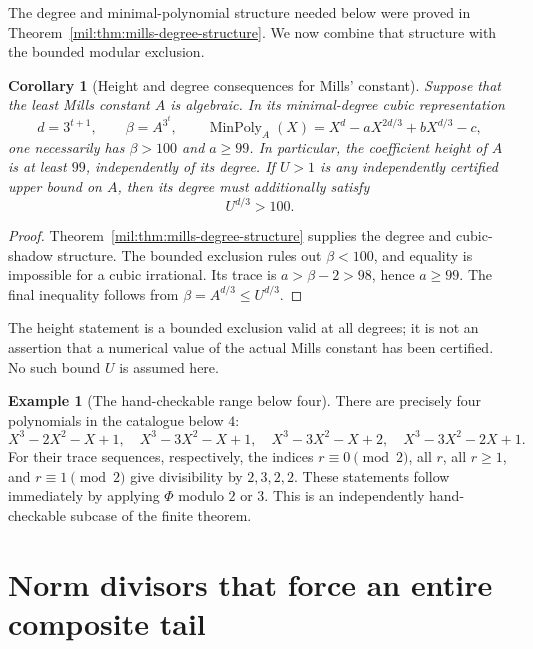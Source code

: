 \documentclass[11pt,a4paper]{article}
\newtheorem{corollary}[theorem]{Corollary}
\theoremstyle{definition}
\newtheorem{example}[theorem]{Example}
\theoremstyle{remark}
\numberwithin{equation}{section}
\begin{document}
The degree and minimal-polynomial structure needed below were proved in
Theorem~\ref{mil:thm:mills-degree-structure}. We now combine that
structure with the bounded modular exclusion.

\begin{corollary}[Height and degree consequences for Mills' constant]
Suppose that the least Mills constant $A$ is algebraic. In its
minimal-degree cubic representation
\[
 d=3^{t+1},\qquad\beta=A^{3^t},\qquad
 \operatorname{MinPoly}_A(X)
   =X^d-aX^{2d/3}+bX^{d/3}-c,
\]
one necessarily has $\beta>100$ and $a\ge99$. In particular, the
coefficient height of $A$ is at least $99$, independently of its
degree. If $U>1$ is any independently certified upper bound on $A$,
then its degree must additionally satisfy
\[
 U^{d/3}>100.
\]
\end{corollary}
\begin{proof}
Theorem~\ref{mil:thm:mills-degree-structure} supplies the degree and
cubic-shadow structure. The bounded exclusion
rules out $\beta<100$, and equality is impossible for a cubic
irrational. Its trace is $a>\beta-2>98$, hence $a\ge99$.
The final inequality follows from $\beta=A^{d/3}\le U^{d/3}$.
\end{proof}

The height statement is a bounded exclusion valid at all degrees;
it is not an assertion that a numerical value of the actual Mills
constant has been certified. No such bound $U$ is assumed here.

\begin{example}[The hand-checkable range below four]
There are precisely four polynomials in the catalogue below $4$:
\[
 X^3-2X^2-X+1,\quad X^3-3X^2-X+1,\quad
 X^3-3X^2-X+2,\quad X^3-3X^2-2X+1.
\]
For their trace sequences, respectively, the indices
$r\equiv0\pmod2$, all $r$, all $r\ge1$, and
$r\equiv1\pmod2$ give divisibility by $2,3,2,2$.
These statements follow immediately by applying $\Phi$ modulo $2$
or $3$. This is an independently hand-checkable subcase of the
finite theorem.
\end{example}

\section{Norm divisors that force an entire composite tail}
\end{document}
